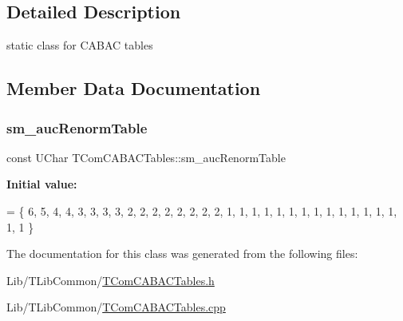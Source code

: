 \subsection{Detailed Description}
static class for C\+A\+B\+AC tables 

\subsection{Member Data Documentation}
\mbox{\label{class_t_com_c_a_b_a_c_tables_aa83f0c3e1f0cc8e253448663815a93fc}} 
\subsubsection{\texorpdfstring{sm\+\_\+auc\+Renorm\+Table}{sm\_aucRenormTable}}
{\footnotesize\ttfamily const U\+Char T\+Com\+C\+A\+B\+A\+C\+Tables\+::sm\+\_\+auc\+Renorm\+Table\hspace{0.3cm}{\ttfamily [static]}}

{\bfseries Initial value\+:}
\begin{DoxyCode}
=
\{
  6,  5,  4,  4,
  3,  3,  3,  3,
  2,  2,  2,  2,
  2,  2,  2,  2,
  1,  1,  1,  1,
  1,  1,  1,  1,
  1,  1,  1,  1,
  1,  1,  1,  1
\}
\end{DoxyCode}


The documentation for this class was generated from the following files\+:\begin{DoxyCompactItemize}
\item 
Lib/\+T\+Lib\+Common/\hyperlink{_t_com_c_a_b_a_c_tables_8h}{T\+Com\+C\+A\+B\+A\+C\+Tables.\+h}\item 
Lib/\+T\+Lib\+Common/\hyperlink{_t_com_c_a_b_a_c_tables_8cpp}{T\+Com\+C\+A\+B\+A\+C\+Tables.\+cpp}\end{DoxyCompactItemize}
